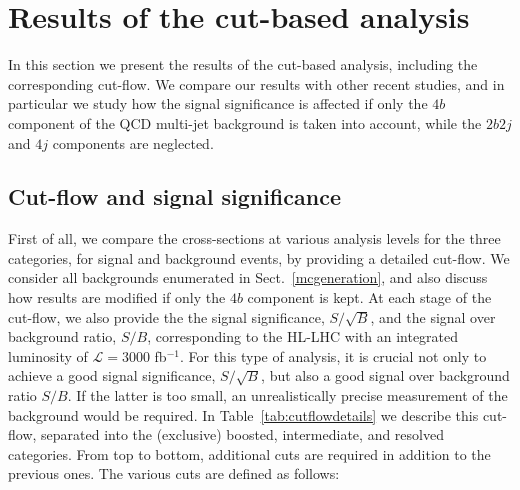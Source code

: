 
\section{Results of the cut-based analysis}

\label{sec:results}

In this section we present the results of the 
cut-based analysis, including the corresponding
cut-flow.
We
compare our results with other recent studies,
and in particular
we study how the signal significance
is affected if only the $4b$ component of the
QCD multi-jet background is taken into account,
while the $2b2j$ and $4j$ components are neglected.
%


\subsection{Cut-flow and signal significance}

First of all, we compare the cross-sections at various
analysis levels for the three categories, for signal and background events,
by providing a detailed cut-flow.
%
We consider all backgrounds enumerated in Sect.~\ref{mcgeneration},
and also discuss how results are modified if only the $4b$
component is kept.
%
At each stage of the cut-flow, we also provide the
the signal significance, $S/\sqrt{B}$, and the signal
over background ratio, $S/B$, corresponding to the
 HL-LHC with
an integrated luminosity of $\mathcal{L}
=3000$ fb$^{-1}$.
%
For this type of analysis,
it is crucial not only to achieve a good signal
significance, $S/\sqrt{B}$, but also a good signal over background ratio $S/B$.
%
If the latter is too small, an unrealistically precise
measurement of the background would be required.
%
In Table~\ref{tab:cutflowdetails}
we describe this cut-flow,
separated into the (exclusive) boosted, intermediate,
    and resolved categories.
    From top to bottom, additional cuts are required in addition
    to the previous ones.
    The various cuts
    are defined as follows:

   

